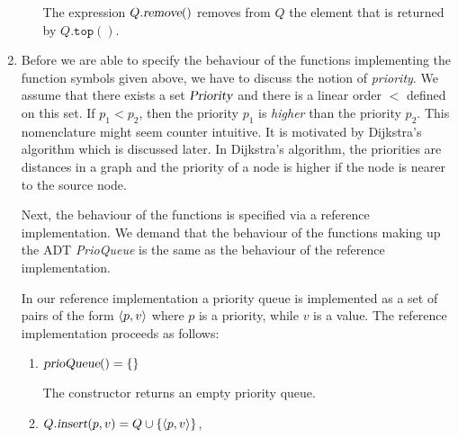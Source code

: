 \begin{Definition}
\begin{enumerate}
\begin{enumerate}
              The expression $Q.\textsl{remove}()$ removes from $Q$ the element that is returned by
              $Q.\texttt{top}()$.
        \end{enumerate}
\item Before we are able to specify the behaviour of the functions implementing the function symbols
      given above, we have to discuss the notion of \emph{priority}.  We assume that there exists
      a set $\textsl{Priority}$ and there is a linear order $<$ defined on this set.
      If  $p_1 < p_2$, then the priority $p_1$ is \emph{higher} than the priority $p_2$.  This
      nomenclature might seem counter intuitive.  It is motivated by 
      Dijkstra's algorithm which is discussed later.  In Dijkstra's algorithm, the priorities are
      distances in a graph and the priority of a node is higher if the node is nearer to the source
      node.

      Next, the behaviour of the functions is specified via a reference implementation.  We demand
      that the behaviour of the functions making up the ADT \textsl{PrioQueue} is the same
      as the behaviour of the reference implementation.
      
      In our reference implementation a priority queue is implemented as a set of pairs of the form 
      $\pair(p,v)$ where $p$ is a priority, while $v$ is a value.  The reference implementation
      proceeds as follows:
      \begin{enumerate}
      \item $\textsl{prioQueue}() = \{\}$

            The constructor returns an empty priority queue.
      \item $Q.\textsl{insert}(p, v) = Q \cup \{ \pair(p,v) \}$,
        

\end{enumerate}
\end{enumerate}
\end{Definition}
